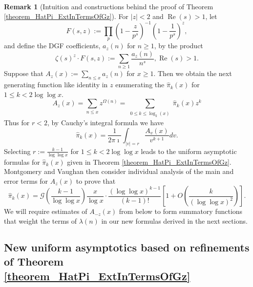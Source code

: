 \documentclass[11pt,reqno,a4letter]{article}
\numberwithin{figure}{section}
\numberwithin{table}{section}
\theoremstyle{plain}
\numberwithin{theorem}{section}
\theoremstyle{definition}
\newtheorem{remark}[theorem]{Remark}
\renewcommand{\Re}{\operatorname{Re}}
\begin{document}
\begin{remark}[Intuition and constructions behind the proof of Theorem \ref{theorem_HatPi_ExtInTermsOfGz}] 
\label{remark_intuitionConstrIn_theorem_HatPi_ExtInTermsOfGz} 
For $|z| < 2$ and $\Re(s) > 1$, let 
\begin{equation} 
\label{eqn_IntuitionMVThm_FszFuncDef_v1} 
F(s, z) := \prod_{p} \left(1 - \frac{z}{p^s}\right)^{-1} \left(1 - \frac{1}{p^s}\right)^{z}, 
\end{equation} 
and define the DGF coefficients, $a_z(n)$ for $n \geq 1$, by the product 
\[
\zeta(s)^{z} \cdot F(s, z) := \sum_{n \geq 1} \frac{a_z(n)}{n^s}, \Re(s) > 1. 
\]
Suppose that $A_z(x) := \sum_{n \leq x} a_z(n)$ for $x \geq 1$. Then we obtain the next 
generating function like identity in $z$ enumerating the $\widehat{\pi}_k(x)$ for 
$1 \leq k < 2 \log\log x$. 
\begin{equation} 
\label{eqn_remark_MV_AzxCoeffFormlaIntegral_v1} 
A_z(x) = \sum_{n \leq x} z^{\Omega(n)} = \sum_{\substack{0 \leq k \leq \log_2(x)}} \widehat{\pi}_k(x) z^k 
\end{equation} 
Thus for $r < 2$, by Cauchy's integral formula we have 
\[
\widehat{\pi}_k(x) = \frac{1}{2\pi\imath} \int_{|v|=r} \frac{A_v(x)}{v^{k+1}} dv. 
\]
Selecting $r := \frac{k-1}{\log\log x}$ for $1 \leq k < 2 \log\log x$ 
leads to the uniform asymptotic formulas for $\widehat{\pi}_k(x)$ given in 
Theorem \ref{theorem_HatPi_ExtInTermsOfGz}. 
Montgomery and Vaughan then consider individual analysis of the main and error 
terms for $A_z(x)$ to prove that 
\[
\widehat{\pi}_k(x) = \mathcal{G}\left(\frac{k-1}{\log\log x}\right) \frac{x}{\log x} \cdot 
     \frac{(\log\log x)^{k-1}}{(k-1)!} \left[1 + O\left(\frac{k}{(\log\log x)^2}\right)\right]. 
\]
We will require estimates of $A_{-z}(x)$ from below to form summatory functions 
that weight the terms of $\lambda(n)$ in our new formulas derived in the next sections. 
\end{remark} 

\subsection{New uniform asymptotics based on refinements of Theorem \ref{theorem_HatPi_ExtInTermsOfGz}} 
\label{subSection_PartialPrimeProducts_Proofs} 
\end{document}
